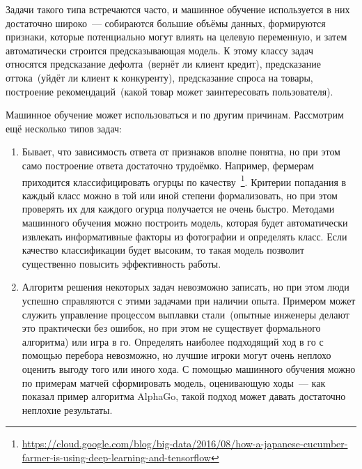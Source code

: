 \documentclass[12pt,fleqn]{article}
\begin{document}
Задачи такого типа встречаются часто, и машинное обучение используется в них достаточно широко~---
собираются большие объёмы данных, формируются признаки, которые потенциально могут влиять на целевую переменную,
и затем автоматически строится предсказывающая модель.
К этому классу задач относятся
предсказание дефолта~(вернёт ли клиент кредит),
предсказание оттока~(уйдёт ли клиент к конкуренту),
предсказание спроса на товары,
построение рекомендаций~(какой товар может заинтересовать пользователя).

Машинное обучение может использоваться и по другим причинам.
Рассмотрим ещё несколько типов задач:
\begin{enumerate}
    \item Бывает, что зависимость ответа от признаков вполне понятна,
        но при этом само построение ответа достаточно трудоёмко.
        Например, фермерам приходится классифицировать огурцы по качеству~\footnote{\url{https://cloud.google.com/blog/big-data/2016/08/how-a-japanese-cucumber-farmer-is-using-deep-learning-and-tensorflow}}.
        Критерии попадания в каждый класс можно в той или иной степени формализовать,
        но при этом проверять их для каждого огурца получается не очень быстро.
        Методами машинного обучения можно построить модель, которая будет автоматически
        извлекать информативные факторы из фотографии и определять класс.
        Если качество классификации будет высоким, то такая модель позволит
        существенно повысить эффективность работы.
    \item Алгоритм решения некоторых задач невозможно записать, но при этом люди
        успешно справляются с этими задачами при наличии опыта.
        Примером может служить управление процессом выплавки стали~(опытные инженеры
        делают это практически без ошибок, но при этом не существует формального алгоритма)
        или игра в го.
        Определять наиболее подходящий ход в го с помощью перебора невозможно,
        но лучшие игроки могут очень неплохо оценить выгоду того или иного хода.
        С помощью машинного обучения можно по примерам матчей сформировать модель,
        оценивающую ходы~--- как показал пример алгоритма AlphaGo,
        такой подход может давать достаточно неплохие результаты.
\end{enumerate}
\end{document}
